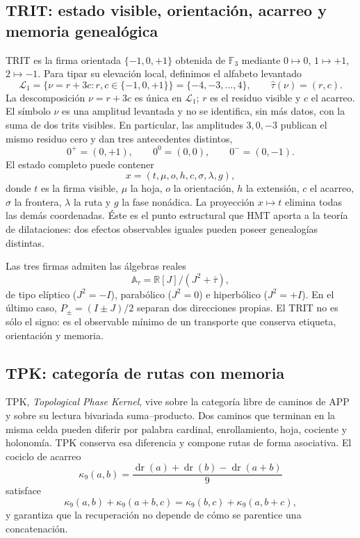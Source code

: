 \subsection{TRIT: estado visible, orientación, acarreo y memoria genealógica}

TRIT es la firma orientada $\{-1,0,+1\}$ obtenida de $\mathbb F_3$ mediante
$0\mapsto0$, $1\mapsto+1$, $2\mapsto-1$. Para tipar su elevación local,
definimos el alfabeto levantado
\[
 \mathcal L_1=\{\nu=r+3c:r,c\in\{-1,0,+1\}\}
 =\{-4,-3,\ldots,4\},
 \qquad
 \widehat\tau(\nu)=(r,c).
 \tag{GMC-2.7}
\]
La descomposición $\nu=r+3c$ es única en $\mathcal L_1$; $r$ es el residuo
visible y $c$ el acarreo. El símbolo $\nu$ es una amplitud levantada y no se
identifica, sin más datos, con la suma de dos trits visibles. En particular,
las amplitudes $3,0,-3$ publican el mismo residuo cero y dan tres antecedentes
distintos,
\[
 0^+=(0,+1),\qquad 0^0=(0,0),\qquad0^-=(0,-1).
 \tag{GMC-2.8}
\]
El estado completo puede contener
\[
 x=(t,\mu,o,h,c,\sigma,\lambda,g),
 \tag{GMC-2.9}
\]
donde $t$ es la firma visible, $\mu$ la hoja, $o$ la orientación, $h$ la
extensión, $c$ el acarreo, $\sigma$ la frontera, $\lambda$ la ruta y $g$ la
fase nonádica. La proyección $x\mapsto t$ elimina todas las demás
coordenadas. Éste es el punto estructural que HMT aporta a la teoría de
dilataciones: dos efectos observables iguales pueden poseer genealogías
distintas.

Las tres firmas admiten las álgebras reales
\[
 \mathbb A_\tau=\mathbb R[J]/(J^2+\bar\tau),
\]
de tipo elíptico ($J^2=-I$), parabólico ($J^2=0$) e hiperbólico
($J^2=+I$). En el último caso, $P_\pm=(I\pm J)/2$ separan dos direcciones
propias. El TRIT no es sólo el signo: es el observable mínimo de un transporte
que conserva etiqueta, orientación y memoria.

\subsection{TPK: categoría de rutas con memoria}

TPK, \emph{Topological Phase Kernel}, vive sobre la categoría libre de
caminos de APP y sobre su lectura bivariada suma--producto. Dos caminos que
terminan en la misma celda pueden diferir por palabra cardinal, enrollamiento,
hoja, cociente y holonomía. TPK conserva esa diferencia y compone rutas de
forma asociativa. El cociclo de acarreo
\[
 \kappa_9(a,b)=
 \frac{\operatorname{dr}(a)+\operatorname{dr}(b)
       -\operatorname{dr}(a+b)}9
\]
satisface
\[
 \kappa_9(a,b)+\kappa_9(a+b,c)
 =\kappa_9(b,c)+\kappa_9(a,b+c),
 \tag{GMC-2.10}
\]
y garantiza que la recuperación no depende de cómo se parentice una
concatenación.

